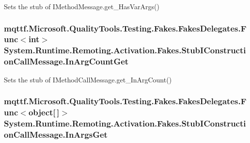 Sets the stub of I\-Method\-Message.\-get\-\_\-\-Has\-Var\-Args()

\hypertarget{class_system_1_1_runtime_1_1_remoting_1_1_activation_1_1_fakes_1_1_stub_i_construction_call_message_af157e9677748add9db7438e6d72372ac}{
\subsubsection[{In\-Arg\-Count\-Get}]{\setlength{\rightskip}{0pt plus 5cm}mqttf.\-Microsoft.\-Quality\-Tools.\-Testing.\-Fakes.\-Fakes\-Delegates.\-Func$<$int$>$ System.\-Runtime.\-Remoting.\-Activation.\-Fakes.\-Stub\-I\-Construction\-Call\-Message.\-In\-Arg\-Count\-Get}}\label{class_system_1_1_runtime_1_1_remoting_1_1_activation_1_1_fakes_1_1_stub_i_construction_call_message_af157e9677748add9db7438e6d72372ac}


Sets the stub of I\-Method\-Call\-Message.\-get\-\_\-\-In\-Arg\-Count()

\hypertarget{class_system_1_1_runtime_1_1_remoting_1_1_activation_1_1_fakes_1_1_stub_i_construction_call_message_a414ea5c6c5b3b577b36c6767d8a1ffa9}{
\subsubsection[{In\-Args\-Get}]{\setlength{\rightskip}{0pt plus 5cm}mqttf.\-Microsoft.\-Quality\-Tools.\-Testing.\-Fakes.\-Fakes\-Delegates.\-Func$<$object\mbox{[}$\,$\mbox{]}$>$ System.\-Runtime.\-Remoting.\-Activation.\-Fakes.\-Stub\-I\-Construction\-Call\-Message.\-In\-Args\-Get}}\label{class_system_1_1_runtime_1_1_remoting_1_1_activation_1_1_fakes_1_1_stub_i_construction_call_message_a414ea5c6c5b3b577b36c6767d8a1ffa9}


